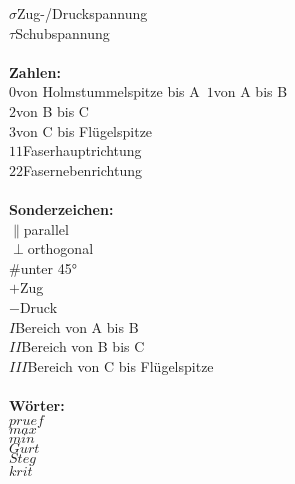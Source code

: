 $\sigma$\quad\quad Zug-/Druckspannung\\
$\tau$\quad\quad Schubspannung\\
\\
\noindent\textbf{Zahlen:}\\
$0$\quad\quad von Holmstummelspitze bis A\
$1$\quad\quad von A bis B\\
$2$\quad\quad von B bis C\\
$3$\quad\quad von C bis Flügelspitze\\
$11$\quad\quad Faserhauptrichtung\\
$22$\quad\quad Fasernebenrichtung\\
\\
\noindent\textbf{Sonderzeichen:}\\
$\parallel$\quad\quad parallel\\
$\perp$\quad\quad orthogonal\\
$\#$\quad\quad unter 45°\\
$+$\quad\quad Zug\\
$-$\quad\quad Druck\\
$I$\quad\quad Bereich von A bis B\\
$II$\quad\quad Bereich von B bis C\\
$III$\quad\quad Bereich von C bis Flügelspitze\\
\\
\noindent\textbf{Wörter:}\\
$pruef$\quad\\
$max$\quad\\
$min$\quad\\
$Gurt$\quad\\
$Steg$\quad\\
$krit$\quad\\